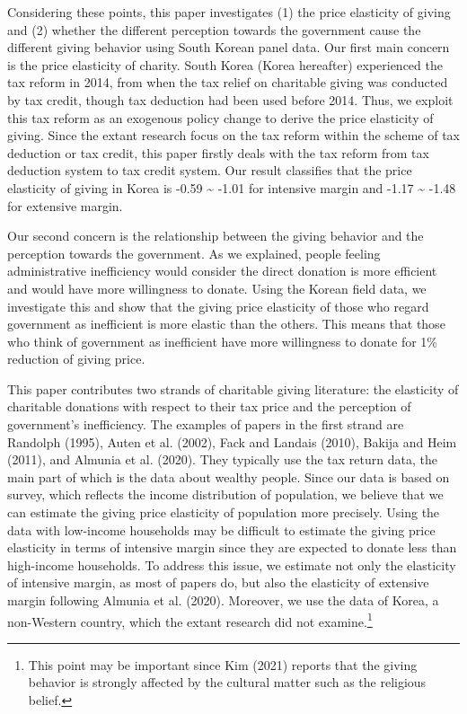 \documentclass[
]{article}
\begin{document}
Considering these points, this paper investigates (1) the price elasticity of giving and (2) whether the different perception towards the government cause the different giving behavior using South Korean panel data.
Our first main concern is the price elasticity of charity. South Korea (Korea hereafter) experienced the tax reform in 2014, from when the tax relief on charitable giving was conducted by tax credit, though tax deduction had been used before 2014. Thus, we exploit this tax reform as an exogenous policy change to derive the price elasticity of giving. Since the extant research focus on the tax reform within the scheme of tax deduction or tax credit, this paper firstly deals with the tax reform from tax deduction system to tax credit system.
Our result classifies that the price elasticity of giving in Korea is -0.59 \textasciitilde{} -1.01 for intensive margin and -1.17 \textasciitilde{} -1.48 for extensive margin.

Our second concern is the relationship between the giving behavior and the perception towards the government. As we explained, people feeling administrative inefficiency would consider the direct donation is more efficient and would have more willingness to donate. Using the Korean field data, we investigate this and show that the giving price elasticity of those who regard government as inefficient is more elastic than the others. This means that those who think of government as inefficient have more willingness to donate for 1\% reduction of giving price.

This paper contributes two strands of charitable giving literature: the elasticity of charitable donations with respect to their tax price and the perception of government's inefficiency. The examples of papers in the first strand are Randolph (1995), Auten et al. (2002), Fack and Landais (2010), Bakija and Heim (2011), and Almunia et al. (2020). They typically use the tax return data, the main part of which is the data about wealthy people. Since our data is based on survey, which reflects the income distribution of population, we believe that we can estimate the giving price elasticity of population more precisely. Using the data with low-income households may be difficult to estimate the giving price elasticity in terms of intensive margin since they are expected to donate less than high-income households. To address this issue, we estimate not only the elasticity of intensive margin, as most of papers do, but also the elasticity of extensive margin following Almunia et al. (2020).
Moreover, we use the data of Korea, a non-Western country, which the extant research did not examine.\footnote{This point may be important since Kim (2021) reports that the giving behavior is strongly affected by the cultural matter such as the religious belief.}
\end{document}
